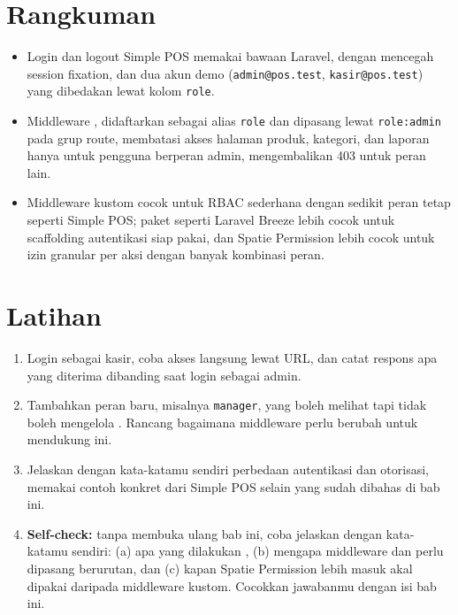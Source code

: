 
\section{Rangkuman}
\label{sec:autentikasi-dan-otorisasi-rangkuman}

\begin{itemize}
  \item Login dan logout Simple POS memakai 
    bawaan Laravel, dengan  mencegah
    session fixation, dan dua akun demo (\texttt{admin@pos.test},
    \texttt{kasir@pos.test}) yang dibedakan lewat kolom \texttt{role}.
  \item Middleware , didaftarkan sebagai
    alias \texttt{role} dan dipasang lewat \texttt{role:admin} pada
    grup route, membatasi akses halaman produk, kategori, dan laporan
    hanya untuk pengguna berperan admin, mengembalikan 403 untuk peran
    lain.
  \item Middleware kustom cocok untuk RBAC sederhana dengan sedikit
    peran tetap seperti Simple POS; paket seperti Laravel Breeze lebih
    cocok untuk scaffolding autentikasi siap pakai, dan Spatie
    Permission lebih cocok untuk izin granular per aksi dengan banyak
    kombinasi peran.
\end{itemize}

\section{Latihan}

\begin{enumerate}
  \item Login sebagai kasir, coba akses  langsung lewat
    URL, dan catat respons apa yang diterima dibanding saat login
    sebagai admin.
  \item Tambahkan peran baru, misalnya \texttt{manager}, yang boleh
    melihat  tapi tidak boleh mengelola
    . Rancang bagaimana middleware perlu berubah untuk
    mendukung ini.
  \item Jelaskan dengan kata-katamu sendiri perbedaan autentikasi dan
    otorisasi, memakai contoh konkret dari Simple POS selain yang sudah
    dibahas di bab ini.
  \item \textbf{Self-check:} tanpa membuka ulang bab ini, coba jelaskan
    dengan kata-katamu sendiri: (a) apa yang dilakukan
    , (b) mengapa middleware 
    dan  perlu dipasang berurutan, dan (c) kapan
    Spatie Permission lebih masuk akal dipakai daripada middleware
    kustom. Cocokkan jawabanmu dengan isi bab ini.
\end{enumerate}

